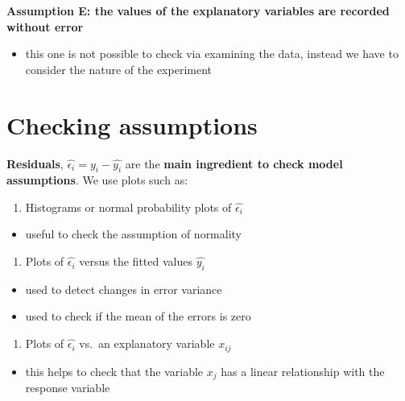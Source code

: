 \documentclass[
]{book}
\providecommand{\tightlist}{%
  \setlength{\itemsep}{0pt}\setlength{\parskip}{0pt}}
\theoremstyle{definition}
\theoremstyle{definition}
\theoremstyle{definition}
\theoremstyle{remark}
\begin{document}
\textbf{Assumption E: the values of the explanatory variables are recorded without error}

\begin{itemize}
\tightlist
\item
  this one is not possible to check via examining the data, instead we have to consider the nature of the experiment
\end{itemize}

\hypertarget{checking-assumptions}{%
\section{Checking assumptions}\label{checking-assumptions}}

\textbf{Residuals}, \(\hat{\epsilon_i} = y_i - \hat{y_i}\) are the \textbf{main ingredient to check model assumptions}. We use plots such as:

\begin{enumerate}
\def\labelenumi{\arabic{enumi}.}
\tightlist
\item
  Histograms or normal probability plots of \(\hat{\epsilon_i}\)
\end{enumerate}

\begin{itemize}
\tightlist
\item
  useful to check the assumption of normality
\end{itemize}

\begin{enumerate}
\def\labelenumi{\arabic{enumi}.}
\setcounter{enumi}{1}
\tightlist
\item
  Plots of \(\hat{\epsilon_i}\) versus the fitted values \(\hat{y_i}\)
\end{enumerate}

\begin{itemize}
\tightlist
\item
  used to detect changes in error variance
\item
  used to check if the mean of the errors is zero
\end{itemize}

\begin{enumerate}
\def\labelenumi{\arabic{enumi}.}
\setcounter{enumi}{2}
\tightlist
\item
  Plots of \(\hat{\epsilon_i}\) vs.~an explanatory variable \(x_{ij}\)
\end{enumerate}

\begin{itemize}
\tightlist
\item
  this helps to check that the variable \(x_j\) has a linear relationship with the response variable
\end{itemize}
\end{document}
